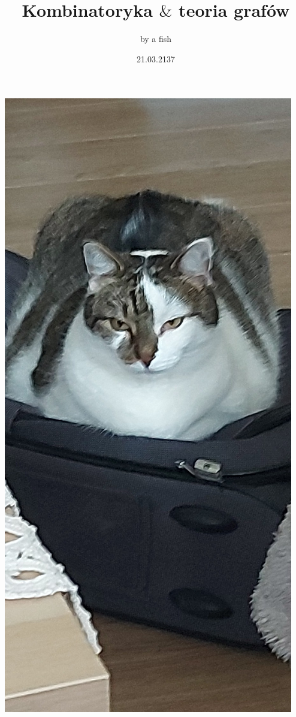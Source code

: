 \documentclass{article}[17pt]
\title {Kombinatoryka $\&$ teoria grafów}
\author{by a fish}
\date {21.03.2137}
\begin{document}
\maketitle

\newpage

\begin{center}
    \includegraphics[height=\textheight]{potega.jpg}
\end{center}
\end{document}
